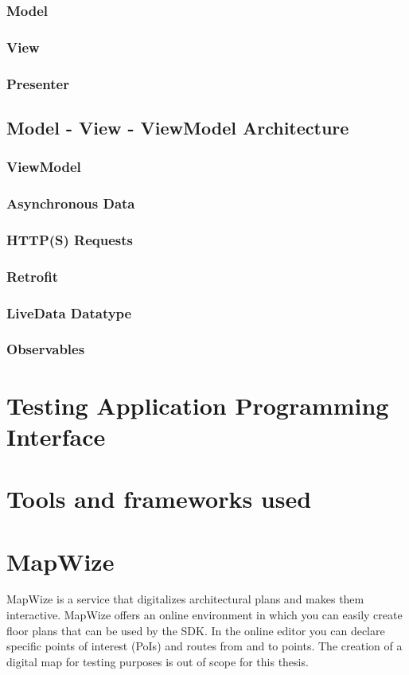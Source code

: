\subsubsection{Model}
\subsubsection{View}
\subsubsection{Presenter}
\subsection{Model - View - ViewModel Architecture}
\subsubsection{ViewModel}
\subsubsection{Asynchronous Data}
\subsubsection{HTTP(S) Requests}
\subsubsection{Retrofit}
\subsubsection{LiveData Datatype}
\subsubsection{Observables}
\section{Testing Application Programming Interface}
\section{Tools and frameworks used}
\section{MapWize}
MapWize is a service that digitalizes architectural plans and makes them interactive. MapWize offers an online environment in which you can easily create floor plans that can be used by the SDK. In the online editor you can declare specific points of interest (PoIs) and routes from and to points. The creation of a digital map for testing purposes is out of scope for this thesis. 

